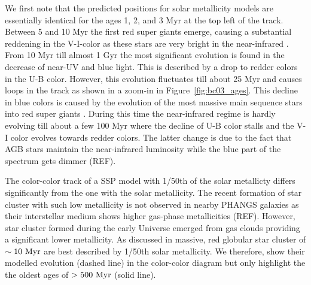We first note that the predicted positions for solar metallicity models are essentially identical for the ages 1, 2, and 3 Myr at the top left of the  track. Between 5 and 10 Myr the first red super giants emerge, causing a substantial reddening in the V-I-color as these stars are very bright in the near-infrared \citep{white_photoelectric_1978}. 
From 10 Myr till almost 1 Gyr the most significant evolution is found in the decrease of near-UV and blue light. 
This is described by a drop to redder colors in the U-B color. However, this evolution fluctuates till about 25 Myr and causes loops in the track as shown in a zoom-in in Figure~\ref{fig:bc03_ages}. This decline in blue colors is caused by the evolution of the most massive main sequence stars into red super giants . 
During this time the near-infrared regime is hardly evolving till about a few 100 Myr where the decline of U-B color stalls and the V-I color evolves towards redder colors. The latter change is due to the fact that AGB stars maintain the near-infrared luminosity while the blue part of the spectrum gets dimmer (REF).

The color-color track of a SSP model with 1/50th of the solar metallicty differs significantly from the one with the solar metallicity. The recent formation of star cluster with such low metallicity is not observed in nearby PHANGS galaxies as their interstellar medium shows higher gas-phase metallicities (REF). However, star cluster formed during the early Universe emerged from gas clouds providing a significant lower metallicity. As discussed in \citet{whitmore_improving_2023} massive, red globular star cluster of $\sim10~{\rm Myr}$ are best described by 1/50th solar metallicity. We therefore, show their modelled evolution (dashed line) in the color-color diagram but only highlight the the oldest ages of $> 500~{\rm Myr}$ (solid line).  

